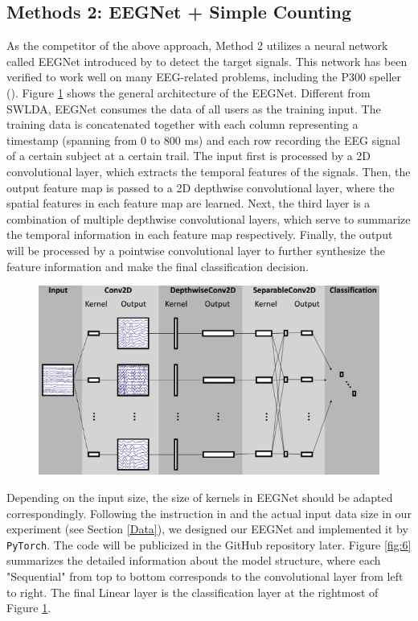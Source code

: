 \documentclass{article}
\begin{document}
\subsection{Methods 2: EEGNet + Simple Counting} \label{EEGNet}
As the competitor of the above approach, Method 2 utilizes a neural network called EEGNet introduced by \cite{lawhern2018eegnet} to detect the target signals. This network has been verified to work well on many EEG-related problems, including the P300 speller (\cite{lee2020cnn}). Figure \ref{fig:5} shows the general architecture of the EEGNet. Different from SWLDA, EEGNet consumes the data of all users as the training input. The training data is concatenated together with each column representing a timestamp (spanning from $0$ to $800$ ms) and each row recording the EEG signal of a certain subject at a certain trail. The input first is processed by a 2D convolutional layer, which extracts the temporal features of the signals. Then, the output feature map is passed to a 2D depthwise convolutional layer, where the spatial features in each feature map are learned. Next, the third layer is a combination of multiple depthwise convolutional layers, which serve to summarize the temporal information in each feature map respectively. Finally, the output will be processed by a pointwise convolutional layer to further synthesize the feature information and make the final classification decision.

\begin{figure}[H]
	\centering
	\includegraphics[width=0.7\linewidth]{architecture.jpg}
	\label{fig:5}
\end{figure}

\vspace{-3mm}
Depending on the input size, the size of kernels in EEGNet should be adapted correspondingly. Following the instruction in \cite{lawhern2018eegnet} and the actual input data size in our experiment (see Section \ref{Data}), we designed our EEGNet and implemented it by \texttt{PyTorch}. The code will be publicized in the GitHub repository later. Figure \ref{fig:6} summarizes the detailed information about the model structure, where each "Sequential" from top to bottom corresponds to the convolutional layer from left to right. The final Linear layer is the classification layer at the rightmost of Figure \ref{fig:5}.
\end{document}
